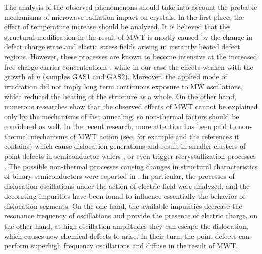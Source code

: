 \documentclass[10pt]{iopart}
\begin{document}
The analysis of the observed phenomenons should take into account
the probable mechanisms of microwave radiation impact on crystals.
In the first place, the effect of temperature increase should be analyzed.
It is believed that the structural modification in the result of MWT  is mostly caused by the change
in defect charge state and elastic stress fields arising in instantly heated defect regions.
However, these processes are known to become intensive at the increased free charge carrier concentrations \cite{MW:Rev},
while in our case the effects weaken with the growth of $n$ (samples GAS1 and GAS2).
Moreover, the applied mode of irradiation did not imply long term continuous exposure to MW oscillations,
which reduced the heating of the structure as a whole.
On the other hand, numerous researches show that the observed effects of MWT cannot be explained only by the mechanisms of fast  annealing,
so non-thermal factors should be considered as well.
In the recent research, more attention has been paid to non-thermal mechanisms of MWT action
(see, for example \cite{MW:Si2018} and the references it contains)
which cause dislocation generations and result in smaller  clusters of point defects in semiconductor wafers \cite{Konakova2007JTFEn},
or even trigger recrystallization processes \cite{MW:Si2018}.
The possible non-thermal processes causing changes in structural characteristics of binary semiconductors were reported in \cite{Konakova2007JTFEn}.
In particular, the processes of dislocation oscillations under the action of electric field were analyzed,
and the decorating impurities have been found to influence essentially the behavior of dislocation segments.
On the one hand, the available impurities decrease the resonance frequency of oscillations
and provide the presence of electric charge,
on the other hand, at high oscillation amplitudes they can escape the dislocation,
which causes new chemical defects to arise.
In their turn, the point defects can perform superhigh frequency oscillations and diffuse in the result of MWT.
\end{document}
